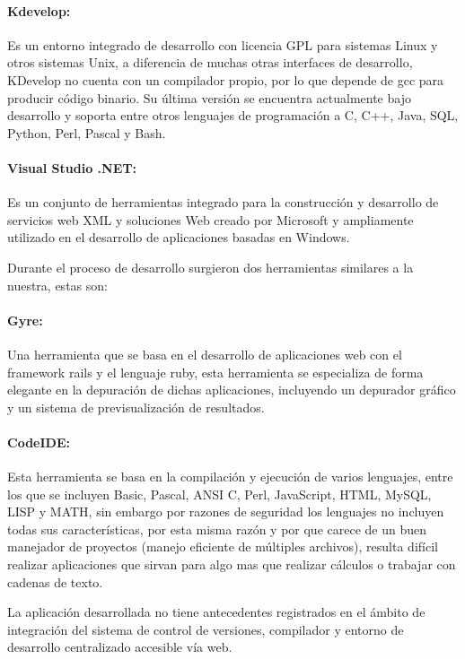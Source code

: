 \paragraph{Kdevelop: \cite{kdevelop}} Es un entorno integrado de desarrollo con licencia GPL para sistemas Linux y otros sistemas Unix, a diferencia de muchas otras interfaces de desarrollo, KDevelop no cuenta con un compilador propio, por lo que depende de gcc para producir código binario. Su última versión se encuentra actualmente bajo desarrollo y soporta entre otros lenguajes de programación a C, C++, Java, SQL, Python, Perl, Pascal y Bash.

\paragraph{Visual Studio .NET: \cite{visual_studio}} Es un conjunto de herramientas integrado para la construcción y desarrollo de servicios web XML y soluciones Web creado por Microsoft y ampliamente utilizado en el desarrollo de aplicaciones basadas en Windows.


Durante el proceso de desarrollo surgieron dos herramientas similares a la nuestra, estas son:


\paragraph{Gyre:\cite{gyre}} Una herramienta que se basa en el desarrollo de aplicaciones web con el framework rails y el lenguaje ruby, esta herramienta se especializa de forma elegante en la depuración de dichas aplicaciones, incluyendo un depurador gráfico y un sistema de previsualización de resultados.

\paragraph{CodeIDE:\cite{codeide}} Esta herramienta se basa en la compilación y ejecución de varios lenguajes, entre los que se incluyen Basic, Pascal, ANSI C, Perl, JavaScript, HTML, MySQL, LISP y MATH, sin embargo por razones de seguridad los lenguajes no incluyen todas sus características, por esta misma razón y por que carece de un buen manejador de proyectos (manejo eficiente de múltiples archivos), resulta difícil realizar aplicaciones que sirvan para algo mas que realizar cálculos o trabajar con cadenas de texto.


La aplicación desarrollada no tiene antecedentes registrados en el ámbito de integración del sistema de control de versiones, compilador y entorno de desarrollo centralizado accesible vía web.